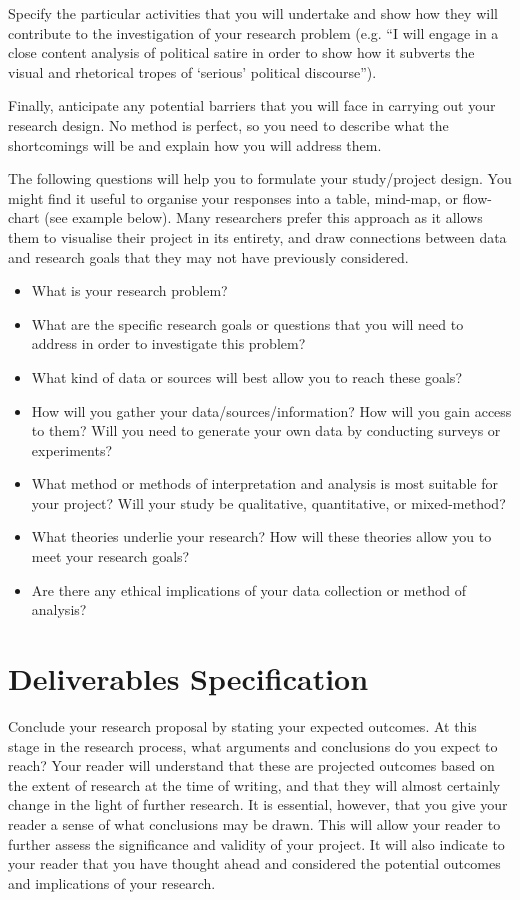 \documentclass[12pt, a4paper]{article}
\begin{document}
Specify the particular activities that you will undertake and show how they will contribute to the investigation of your research problem (e.g. “I will engage in a close content analysis of political satire in order to show how it subverts the visual and rhetorical tropes of ‘serious’ political discourse”).

Finally, anticipate any potential barriers that you will face in carrying out your research design. No method is perfect, so you need to describe what the shortcomings will be and explain how you will address them.

The following questions will help you to formulate your study/project design. You might find it useful to organise your responses into a table, mind-map, or flow-chart (see example below). Many researchers prefer this approach as it allows them to visualise their project in its entirety, and draw connections between data and research goals that they may not have previously considered.
\begin{itemize}
\item What is your research problem?
\item What are the specific research goals or questions that you will need to address in order to investigate this problem?
\item What kind of data or sources will best allow you to reach these goals?
\item How will you gather your data/sources/information? How will you gain access to them? Will you need to generate your own data by conducting surveys or experiments?
\item What method or methods of interpretation and analysis is most suitable for your project? Will your study be qualitative, quantitative, or mixed-method?
\item What theories underlie your research? How will these theories allow you to meet your research goals?
\item Are there any ethical implications of your data collection or method of analysis?
\end{itemize}


\section{Deliverables Specification}
Conclude your research proposal by stating your expected outcomes. At this stage in the research process, what arguments and conclusions do you expect to reach? Your reader will understand that these are projected outcomes based on the extent of research at the time of writing, and that they will almost certainly change in the light of further research. It is essential, however, that you give your reader a sense of what conclusions may be drawn. This will allow your reader to further assess the significance and validity of your project. It will also indicate to your reader that you have thought ahead and considered the potential outcomes and implications of your research.
\end{document}
